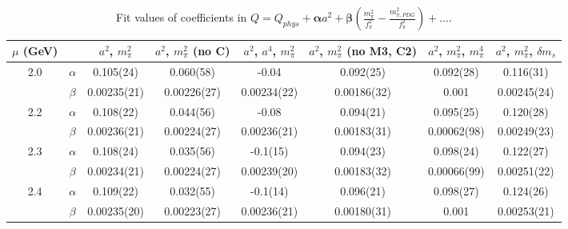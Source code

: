 \documentclass[12pt]{extarticle}
\begin{document}
\begin{table}[h!]
\begin{center}
\begin{tabular}{|c c|c|c|c|c|c|c|}
\hline
$\mu$ (GeV) &  & $a^2$, $m_\pi^2$& $a^2$, $m_\pi^2$ (no C)& $a^2$, $a^4$, $m_\pi^2$& $a^2$, $m_\pi^2$ (no M3, C2)& $a^2$, $m_\pi^2$, $m_\pi^4$& $a^2$, $m_\pi^2$, $\delta m_s$\\
\hline
\multirow{2}{0.5in}{2.0} & $\alpha$ & 0.105(24)& 0.060(58)& -0.04& 0.092(25)& 0.092(28)& 0.116(31)\\
 & $\beta$ & 0.00235(21)& 0.00226(27)& 0.00234(22)& 0.00186(32)& 0.001& 0.00245(24)\\
\hline
\multirow{2}{0.5in}{2.2} & $\alpha$ & 0.108(22)& 0.044(56)& -0.08& 0.094(21)& 0.095(25)& 0.120(28)\\
 & $\beta$ & 0.00236(21)& 0.00224(27)& 0.00236(21)& 0.00183(31)& 0.00062(98)& 0.00249(23)\\
\hline
\multirow{2}{0.5in}{2.3} & $\alpha$ & 0.108(24)& 0.035(56)& -0.1(15)& 0.094(23)& 0.098(24)& 0.122(27)\\
 & $\beta$ & 0.00234(21)& 0.00224(27)& 0.00239(20)& 0.00183(32)& 0.00066(99)& 0.00251(22)\\
\hline
\multirow{2}{0.5in}{2.4} & $\alpha$ & 0.109(22)& 0.032(55)& -0.1(14)& 0.096(21)& 0.098(27)& 0.124(26)\\
 & $\beta$ & 0.00235(20)& 0.00223(27)& 0.00236(21)& 0.00180(31)& 0.001& 0.00253(21)\\
\hline
\end{tabular}
\caption{Fit values of coefficients in $Q = Q_{phys} + \mathbf{\alpha} a^2 + \mathbf{\beta}\left(\frac{m_\pi^2}{f_\pi^2}-\frac{m_{\pi,PDG}^2}{f_\pi^2}\right) + \ldots$.}
\end{center}
\end{table}
























\clearpage
\end{document}
